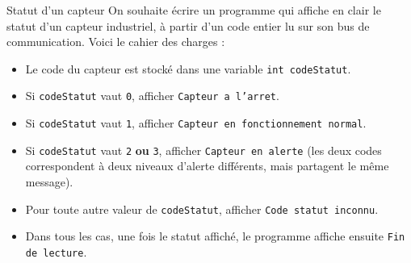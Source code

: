 
\begin{UPSTIexercice}{Statut d'un capteur}
    On souhaite écrire un programme qui affiche en clair le statut d'un capteur industriel, à partir d'un code entier lu sur son bus de communication. Voici le cahier des charges :
    \begin{itemize}
        \item Le code du capteur est stocké dans une variable \texttt{int codeStatut}.
        \item Si \texttt{codeStatut} vaut \texttt{0}, afficher \texttt{Capteur a l'arret}.
        \item Si \texttt{codeStatut} vaut \texttt{1}, afficher \texttt{Capteur en fonctionnement normal}.
        \item Si \texttt{codeStatut} vaut \texttt{2} \textbf{ou} \texttt{3}, afficher \texttt{Capteur en alerte} (les deux codes correspondent à deux niveaux d'alerte différents, mais partagent le même message).
        \item Pour toute autre valeur de \texttt{codeStatut}, afficher \texttt{Code statut inconnu}.
        \item Dans tous les cas, une fois le statut affiché, le programme affiche ensuite \texttt{Fin de lecture}.
    \end{itemize}
\end{UPSTIexercice}

